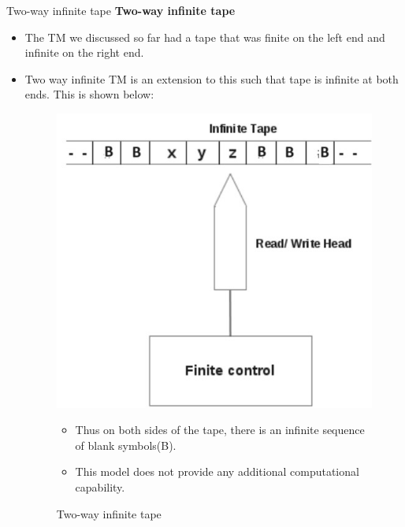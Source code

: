 \documentclass{beamer}
\begin{document}
\begin{frame}{Two-way infinite tape}
	\textbf{Two-way infinite tape}
	\begin{itemize}
		\item The TM we discussed so far had a tape that was finite on the left end and infinite on the right end.
		\item Two way infinite TM is an extension to this such that tape is infinite at both ends. This is shown below:
\begin{figure}
	\includegraphics[scale=.34]{img5/m13}
		\caption{Two-way infinite tape}
		\small \begin{itemize}
			\item Thus on both sides of the tape, there is an infinite sequence of blank symbols(B).
		\item This model does not provide any additional computational capability.
		\end{itemize}
\end{figure}
\end{itemize}
\end{frame}
\end{document}
